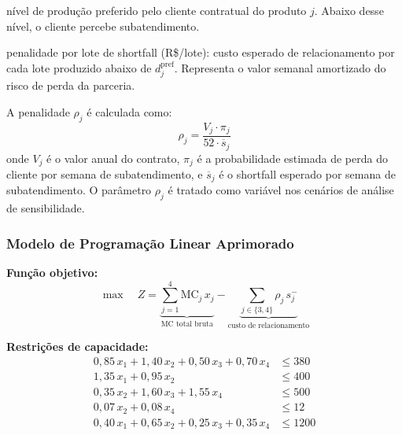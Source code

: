\begin{description}[leftmargin=3cm]
  \item[$d_j^{\text{pref}}$] nível de produção preferido pelo cliente contratual
        do produto $j$. Abaixo desse nível, o cliente percebe subatendimento.
  \item[$\rho_j$] penalidade por lote de shortfall (R\$/lote): custo esperado de
        relacionamento por cada lote produzido abaixo de $d_j^{\text{pref}}$.
        Representa o valor semanal amortizado do risco de perda da parceria.
\end{description}

A penalidade $\rho_j$ é calculada como:
\begin{equation}
  \rho_j = \frac{V_j \cdot \pi_j}{52 \cdot \overline{s}_j}
  \label{eq:rho}
\end{equation}
onde $V_j$ é o valor anual do contrato, $\pi_j$ é a probabilidade estimada de
perda do cliente por semana de subatendimento, e $\overline{s}_j$ é o shortfall
esperado por semana de subatendimento. O parâmetro $\rho_j$ é tratado como
variável nos cenários de análise de sensibilidade.

\subsubsection{Modelo de Programação Linear Aprimorado}

\textbf{Função objetivo:}
\begin{equation}
  \max \quad Z = \underbrace{\sum_{j=1}^{4} \mathrm{MC}_j \, x_j}_{\text{MC total bruta}}
                - \underbrace{\sum_{j \in \{3,4\}} \rho_j \, s_j^-}_{\text{custo de relacionamento}}
  \label{eq:fo_r2}
\end{equation}

\textbf{Restrições de capacidade:}
\begin{align}
  0{,}85\,x_1 + 1{,}40\,x_2 + 0{,}50\,x_3 + 0{,}70\,x_4 &\leq 380
    \tag{R1 -- Teares} \label{eq:tear}\\
  1{,}35\,x_1 + 0{,}95\,x_2 &\leq 400
    \tag{R2 -- Fio algodão} \\
  0{,}35\,x_2 + 1{,}60\,x_3 + 1{,}55\,x_4 &\leq 500
    \tag{R3 -- Fio poliéster} \\
  0{,}07\,x_2 + 0{,}08\,x_4 &\leq 12
    \tag{R4 -- Elastano} \\
  0{,}40\,x_1 + 0{,}65\,x_2 + 0{,}25\,x_3 + 0{,}35\,x_4 &\leq 1200
    \tag{R5 -- MOD}
\end{align}

